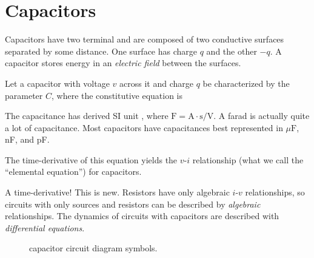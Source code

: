 \documentclass[electronics.tex]{subfiles}
\begin{document}
\section{Capacitors}

Capacitors have two terminal and are composed of two conductive surfaces separated by some distance.
One surface has charge $q$ and the other $-q$.
A capacitor stores energy in an \emph{electric field} between the surfaces.
\tags{}

Let a capacitor with voltage $v$ across it and charge $q$ be characterized by the parameter  $C$, where the constitutive equation is

The capacitance has derived SI unit , where $\text{F} = \text{A}\cdot\text{s}/\text{V}$.
A farad is actually quite a lot of capacitance.
Most capacitors have capacitances best represented in $\mu\text{F}$, nF, and pF.
\tags{}

The time-derivative of this equation yields the $v$-$i$ relationship (what we call the ``elemental equation'') for capacitors.
\tags{}


A time-derivative!
This is new.
Resistors have only algebraic $i$-$v$ relationships, so circuits with only sources and resistors can be described by \emph{algebraic} relationships.
The dynamics of circuits with capacitors are described with \emph{differential equations}.

\begin{figure}[b]%
  \centering
  \quad
  \caption{capacitor circuit diagram symbols.}%
  \label{fig:capacitors}%
\end{figure}
\end{document}
